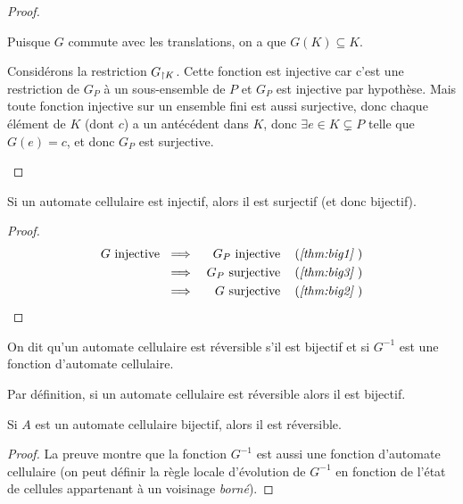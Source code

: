 \begin{proof}
\begin{enumerate}
		      Puisque $G$ commute avec les translations, on a que $G(K) \subseteq K$.

		      Considérons la restriction $G_{\restriction K}$. Cette fonction est injective car c'est une restriction de $G_P$ à un
		      sous-ensemble de $P$ et $G_P$ est injective par hypothèse.
		      Mais toute fonction injective sur un ensemble fini est aussi surjective,
		      donc chaque élément de $K$ (dont $c$) a un antécédent dans $K$,
		      donc $\exists e \in K \subsetneq P$ telle que  $G(e) = c$, et donc $G_P$ est surjective.
	\end{enumerate}
\end{proof}

\begin{coro} \label{coro:inj-surj}
	Si un automate cellulaire est injectif, alors il est surjectif (et donc bijectif).
\end{coro}

\begin{proof}
	\begin{eqnarray*}
		G \text{ injective } &\implies& G_P \text{ injective} \quad\left(\textit{\ref{thm:big1} }\right) \\
		&\implies& G_P \text{ surjective} \quad\left(\textit{\ref{thm:big3} }\right) \\
		&\implies& G \text{ surjective} \quad\left(\textit{\ref{thm:big2} }\right)
	\end{eqnarray*}
\end{proof}


\begin{definition}
	On dit qu'un automate cellulaire est réversible s'il est bijectif et si $G^{-1}$ est une fonction d'automate cellulaire.
\end{definition}

\begin{remarque}
	Par définition, si un automate cellulaire est réversible alors il est bijectif.
\end{remarque}

\begin{prop}\label{prop:bij-rev}
	Si $A$ est un automate cellulaire bijectif, alors il est réversible.
\end{prop}

\begin{proof}
	La preuve montre que la fonction $G^{-1}$ est aussi une fonction d'automate cellulaire
	(on peut définir la règle locale d'évolution de  $G^{-1}$ en fonction de l'état de cellules appartenant à un voisinage \emph{borné}).
\end{proof}

